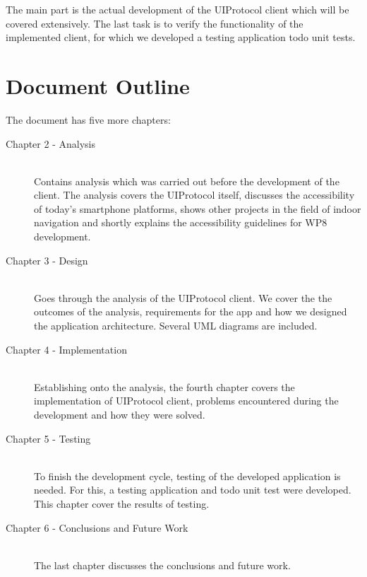 The main part is the actual development of the UIProtocol client which will be covered extensively. The last task is to verify the functionality of the implemented client, for which we developed a testing application todo unit tests.

\section{Document Outline}
The document has five more chapters:

\begin{description}
  \item[Chapter 2 - Analysis] \hfill \\
  Contains analysis which was carried out before the development of the client. The analysis covers the UIProtocol itself, discusses the accessibility of today's smartphone platforms, shows other projects in the field of indoor navigation and shortly explains the accessibility guidelines for WP8 development.
  \item[Chapter 3 - Design] \hfill \\
  Goes through the analysis of the UIProtocol client. We cover the the outcomes of the analysis, requirements for the app and how we designed the application architecture. Several UML diagrams are included.
  \item[Chapter 4 - Implementation] \hfill \\
  Establishing onto the analysis, the fourth chapter covers the implementation of UIProtocol client, problems encountered during the development and how they were solved.
  \item[Chapter 5 - Testing] \hfill \\
  To finish the development cycle, testing of the developed application is needed. For this, a testing application and todo unit test were developed. This chapter cover the results of testing.
    \item[Chapter 6 - Conclusions and Future Work] \hfill \\
    The last chapter discusses the conclusions and future work.
\end{description}
